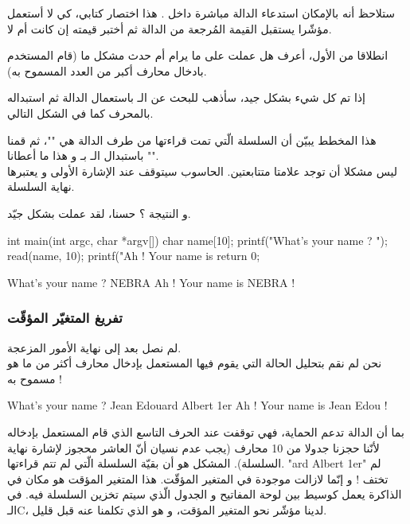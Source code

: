 ستلاحظ أنه بالإمكان استدعاء الدالة
مباشرة داخل
.
هذا اختصار كتابي، كي لا أستعمل مؤشّرا يستقبل القيمة المُرجعة من الدالة ثم أختبر قيمته إن كانت
أم لا.

انطلاقا من
الأول، أعرف هل
عملت على ما يرام أم حدث مشكل ما (قام المستخدم بادخال محارف أكبر من العدد المسموح به).

إذا تم كل شيء بشكل جيد، سأذهب للبحث عن الـ
باستعمال الدالة
ثم استبداله بالمحرف
كما في الشكل التالي.


هذا المخطط يبيّن أن السلسلة الّتي تمت قراءتها من طرف الدالة
هي
""،
ثم قمنا باستبدال الـ
بـ
و هذا ما أعطانا
"".\\
ليس مشكلا أن توجد علامتا
متتابعتين. الحاسوب سيتوقف عند الإشارة الأولى و يعتبرها نهاية السلسلة.

و النتيجة ؟ حسنا، لقد عملت بشكل جيّد.

\begin{Csource}
  int main(int argc, char *argv[])
  {
  	char name[10];
  	printf("What's your name ? ");
  	read(name, 10);
  	printf("Ah ! Your name is %
  	return 0;
  }
\end{Csource}

\begin{Console}
What's your name ? NEBRA
Ah ! Your name is NEBRA !
\end{Console}

\subsubsection{تفريغ المتغيّر المؤقّت}

لم نصل بعد إلى نهاية الأمور المزعجة.\\
نحن لم نقم بتحليل الحالة التي يقوم فيها المستعمل بإدخال محارف أكثر من ما هو مسموح به !

\begin{Console}
What's your name ? Jean Edouard Albert 1er
Ah ! Your name is Jean Edou !
\end{Console}

بما أن الدالة
تدعم الحماية، فهي توقفت عند الحرف التاسع الذي قام المستعمل بإدخاله لأنّنا حجزنا جدولا من 10 محارف (يجب عدم نسيان أنّ العاشر محجوز لإشارة نهاية السلسلة).
المشكل هو أن بقيّة السلسلة الّتي لم تتم قراءتها.
"\textenglish{ard Albert 1er}"
لم تختف ! و إنّما لازالت موجودة في المتغير المؤقّت. هذا المتغير المؤقت هو مكان في الذاكرة يعمل كوسيط بين لوحة المفاتيح و الجدول الّذي سيتم تخزين السلسلة فيه. في الـ\textenglish{C}،
لدينا مؤشّر نحو المتغير المؤقت، و هو
الذي تكلمنا عنه قبل قليل.

